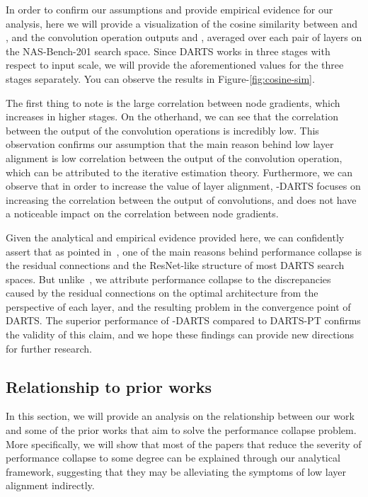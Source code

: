\documentclass{article} \usepackage{fancyhdr, iclr2023_conference, times}
\newcommand{\mydarts}{-DARTS\xspace}
\newcommand{\lambdafn}{layer alignment\xspace}
\begin{document}
\par In order to confirm our assumptions and provide empirical evidence for our analysis, here we will provide a visualization of the cosine similarity between  and , and the convolution operation outputs  and , averaged over each pair of layers on the NAS-Bench-201 search space. Since DARTS works in three stages with respect to input scale, we will provide the aforementioned values for the three stages separately. You can observe the results in Figure-\ref{fig:cosine-sim}.
\par The first thing to note is the large correlation between node gradients, which increases in higher stages. On the otherhand, we can see that the correlation between the output of the convolution operations is incredibly low. This observation confirms our assumption that the main reason behind low \lambdafn is low correlation between the output of the convolution operation, which can be attributed to the iterative estimation theory. Furthermore, we can observe that in order to increase the value of \lambdafn, \mydarts focuses on increasing the correlation between the output of convolutions, and does not have a noticeable impact on the correlation between node gradients.
\par Given the analytical and empirical evidence provided here, we can confidently assert that as pointed in~\citep{DBLP:conf/iclr/WangCCTH21}, one of the main reasons behind performance collapse is the residual connections and the ResNet-like structure of most DARTS search spaces. But unlike~\citep{DBLP:conf/iclr/WangCCTH21}, we attribute performance collapse to the discrepancies caused by the residual connections on the optimal architecture from the perspective of each layer, and the resulting problem in the convergence point of DARTS. The superior performance of \mydarts compared to DARTS-PT confirms the validity of this claim, and we hope these findings can provide new directions for further research.
\subsection{Relationship to prior works}
\label{sec:appndx-priorwork}
In this section, we will provide an analysis on the relationship between our work and some of the prior works that aim to solve the performance collapse problem. More specifically, we will show that most of the papers that reduce the severity of performance collapse to some degree can be explained through our analytical framework, suggesting that they may be alleviating the symptoms of low layer alignment indirectly.
\end{document}
